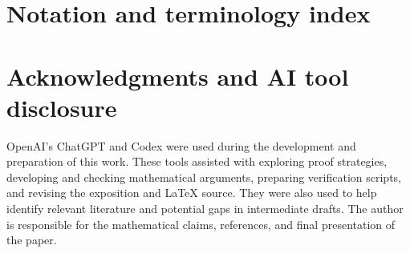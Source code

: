 \documentclass[11pt,reqno]{amsart}
\numberwithin{equation}{section}
\theoremstyle{definition}
\begin{document}
\appendix


\section{Notation and terminology index}
\label{app:notation-terminology}


\section*{Acknowledgments and AI tool disclosure}
OpenAI’s ChatGPT and Codex were used during the development and preparation
of this work. These tools assisted with exploring proof strategies,
developing and checking mathematical arguments, preparing verification
scripts, and revising the exposition and LaTeX source. They were also used
to help identify relevant literature and potential gaps in intermediate
drafts. The author is responsible for the mathematical claims, references,
and final presentation of the paper.


\end{document}
